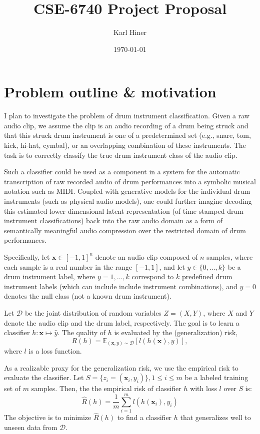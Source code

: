 \documentclass{article}
\title{CSE-6740 Project Proposal}
\author{Karl Hiner}
\date{\today}
\begin{document}
\maketitle

\section{Problem outline \& motivation}

I plan to investigate the problem of drum instrument classification.
Given a raw audio clip, we assume the clip is an audio recording of a drum being struck and that this struck drum instrument is one of a predetermined set (e.g., snare, tom, kick, hi-hat, cymbal), or an overlapping combination of these instruments.
The task is to correctly classify the true drum instrument class of the audio clip.

Such a classifier could be used as a component in a system for the automatic transcription of raw recorded audio of drum performances into a symbolic musical notation such as MIDI.
Coupled with generative models for the individual drum instruments (such as physical audio models), one could further imagine decoding this estimated lower-dimensional latent representation (of time-stamped drum instrument classifications) back into the raw audio domain as a form of semantically meaningful audio compression over the restricted domain of drum performances.

Specifically, let \( \mathbf{x} \in [-1,1]^n \) denote an audio clip composed of \( n \) samples, where each sample is a real number in the range \([-1,1]\), and let \( y \in \{0, \dots, k\} \) be a drum instrument label, where \( y = 1, \dots, k \) correspond to \( k \) predefined drum instrument labels (which can include include instrument combinations), and \( y = 0 \) denotes the null class (not a known drum instrument).

Let \( \mathcal{D} \) be the joint distribution of random variables \( Z = (X, Y) \), where \( X \) and \( Y \) denote the audio clip and the drum label, respectively.
The goal is to learn a classifier \( h: \mathbf{x} \mapsto \hat{y} \). The quality of \( h \) is evaluated by the (generalization) risk,
$$R(h) = \mathbb{E}_{(\mathbf{x}, y) \sim \mathcal{D}}[l(h(\mathbf{x}), y)],$$
where \( l \) is a loss function.

As a realizable proxy for the generalization risk, we use the empirical risk to evaluate the classifier.
Let \( S = \{z_i = (\mathbf{x}_i, y_i)\}, 1 \leq i \leq m \) be a labeled training set of \( m \) samples.
Then, the the empirical risk of classifier $h$ with loss $l$ over $S$ is:
$$\hat{R}(h) = \frac{1}{m} \sum_{i=1}^m l(h(\mathbf{x}_i), y_i)$$
The objective is to minimize \( \hat{R}(h) \) to find a classifier \( h \) that generalizes well to unseen data from \( \mathcal{D} \).
\end{document}
